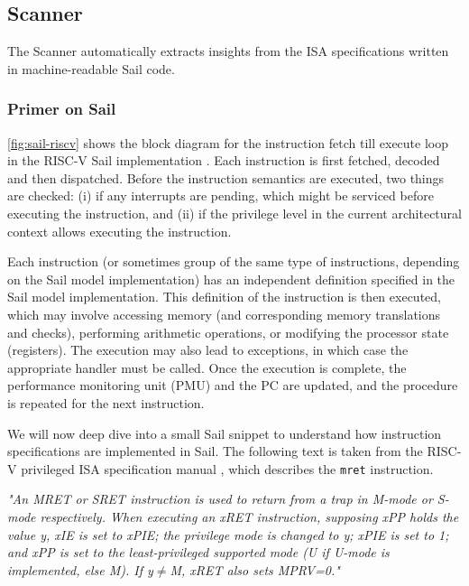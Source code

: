 \subsection{Scanner} 

The Scanner automatically extracts insights from the ISA specifications written in machine-readable Sail code. 

\subsubsection{Primer on Sail}



\autoref{fig:sail-riscv} shows the block diagram for the instruction fetch till execute loop in the RISC-V Sail implementation \cite{sail-riscv}. 
Each instruction is first fetched, decoded and then dispatched. Before the instruction semantics are executed, two things are checked: 
(i) if any interrupts are pending, which might be serviced before executing the instruction, and 
(ii) if the privilege level in the current architectural context allows executing the instruction.

Each instruction (or sometimes group of the same type of instructions, depending on the Sail model implementation) has an independent definition specified in the Sail model implementation. 
This definition of the instruction is then executed, which may involve accessing memory (and corresponding memory translations and checks), performing arithmetic operations, or modifying the processor state (registers). 
The execution may also lead to exceptions, in which case the appropriate handler must be called. 
Once the execution is complete, the performance monitoring unit (PMU) and the PC are updated, and the procedure is repeated for the next instruction. 

We will now deep dive into a small Sail snippet to understand how instruction specifications are implemented in Sail. 
The following text is taken from the RISC-V privileged ISA specification manual \cite{riscv-isa}, which describes the \texttt{mret} instruction.  

\textit{"An MRET or SRET instruction is used to return from a trap in M-mode or S-mode respectively. 
When executing an xRET instruction, supposing xPP holds the value y, xIE is set to xPIE; the privilege mode is
changed to y; xPIE is set to 1; and xPP is set to the least-privileged supported mode (U if U-mode is
implemented, else M). 
If y$\neq{}$M, xRET also sets MPRV=0."} 

